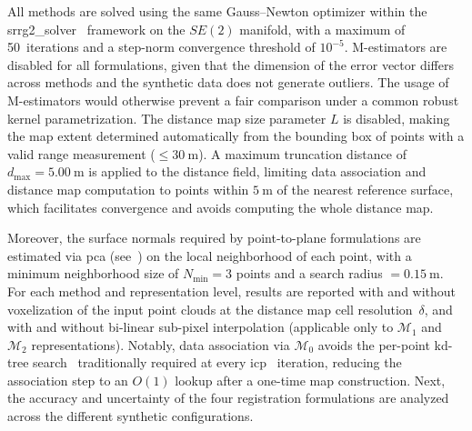 All methods are solved using the same Gauss--Newton optimizer within the
srrg2\_solver~\cite{grisetti:robotics:2020} framework on the $SE(2)$ manifold,
with a maximum of 50~iterations and a step-norm convergence threshold of
$10^{-5}$. M-estimators are disabled for all formulations, given that the
dimension of the error vector differs across methods and the synthetic data
does not generate outliers. The usage of M-estimators would otherwise prevent
a fair comparison under a common robust kernel parametrization.
The distance map size parameter $L$ is disabled, making the map extent
determined automatically from the bounding box of points with a valid range
measurement ($\leq \SI{30}{\metre}$). A maximum truncation distance of
$d_{\max} = \SI{5.00}{\metre}$ is applied to the distance field, limiting data
association and distance map computation to points within $\SI{5}{\metre}$ of
the nearest reference surface, which facilitates convergence and
avoids computing the whole distance map.

Moreover, the surface normals required by point-to-plane formulations are
estimated via \gls{pca} (see~)
on the local neighborhood of each point, with a minimum neighborhood size of
$N_{\min} = 3$ points and a search radius $=\SI{0.15}{\metre}$.
For each method and representation level, results are reported with
and without voxelization of the input point clouds at the distance map cell
resolution~$\delta$, and with and without bi-linear sub-pixel interpolation
(applicable only to $\mathcal{M}_1$ and $\mathcal{M}_2$ representations).
Notably, data association via $\mathcal{M}_0$ avoids the per-point
kd-tree search~\cite{bentley:cacm:1975} traditionally required at every
\gls{icp}~\cite{besl-mckay:tpami:1992,chen-medioni:icra:1991} iteration,
reducing the association step to an $O(1)$ lookup after a one-time map
construction. Next, the accuracy and uncertainty of the four registration
formulations are analyzed across the different synthetic configurations.

